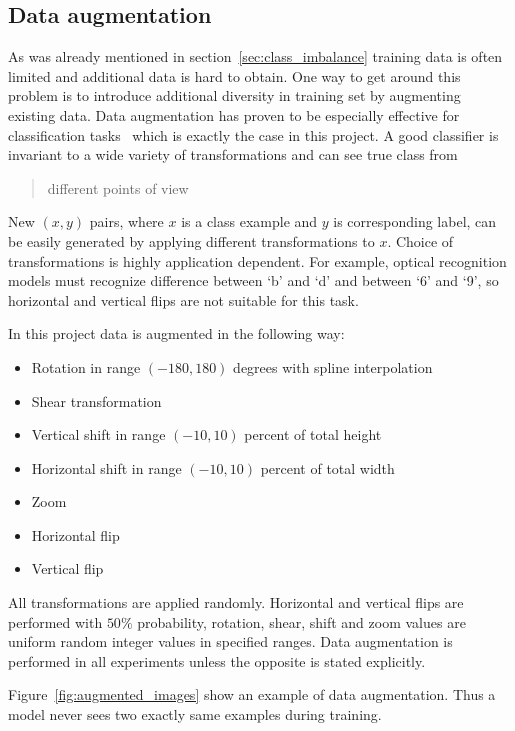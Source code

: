 \documentclass[a4paper, 11pt, table]{article}
\begin{document}
\subsection{Data augmentation}
\label{sec:data_augmentation}
As was already mentioned in section~\ref{sec:class_imbalance} training data is often limited and additional data is hard to obtain. One way to get around this problem is to introduce additional diversity in training set by augmenting existing data. Data augmentation has proven to be especially effective for classification tasks~\cite{dl_book} which is exactly the case in this project. 
A good classifier is invariant to a wide variety of transformations and can see true class from \blockquote{different points of view}. New $(x, y)$ pairs, where $x$ is a class example and $y$ is corresponding label, can be easily generated by applying different transformations to $x$. Choice of transformations is highly application dependent. For example, optical recognition models must recognize difference between `b' and `d' and between `6' and `9', so horizontal and vertical flips are not suitable for this task. 
 

In this project data is augmented in the following way:
\begin{itemize}
\item Rotation in range $(-180, 180)$ degrees with spline interpolation
\item Shear transformation
\item Vertical shift in range $(-10, 10)$ percent of total height
\item Horizontal shift in range $(-10, 10)$ percent of total width
\item Zoom
\item Horizontal flip
\item Vertical flip
\end{itemize}

All transformations are applied randomly. Horizontal and vertical flips are performed with $50\%$ probability, rotation, shear, shift and zoom values are uniform random integer values in specified ranges. Data augmentation is performed in all experiments unless the opposite is stated explicitly.

Figure~\ref{fig:augmented_images} show an example of data augmentation. Thus a model never sees two exactly same examples during training.
\end{document}
